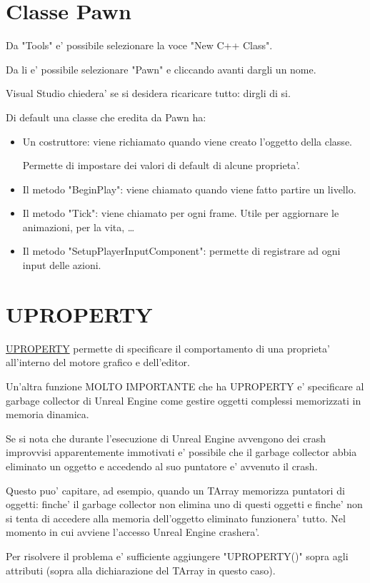     \section{Classe Pawn}

        Da "Tools" e' possibile selezionare la voce "New C++ Class".

        Da li e' possibile selezionare "Pawn" e cliccando avanti dargli un nome.

        \begin{notebox}
            Visual Studio chiedera' se si desidera ricaricare tutto: dirgli di si.
        \end{notebox}

        Di default una classe che eredita da Pawn ha:
        \begin{itemize}
            \item Un costruttore: viene richiamato quando viene creato l'oggetto della classe.

                Permette di impostare dei valori di default di alcune proprieta'.

            \item Il metodo "BeginPlay": viene chiamato quando viene fatto partire un livello.
            \item Il metodo "Tick": viene chiamato per ogni frame. Utile per aggiornare le animazioni, per la vita, \dots
            \item Il metodo "SetupPlayerInputComponent": permette di registrare ad ogni input delle azioni.
        \end{itemize}


    \section{UPROPERTY}
        \href{https://docs.unrealengine.com/5.0/en-US/unreal-engine-uproperty-specifiers}{UPROPERTY} permette di specificare il comportamento di una proprieta' all'interno del motore grafico e dell'editor.

        Un'altra funzione MOLTO IMPORTANTE che ha UPROPERTY e' specificare al garbage collector di Unreal Engine come gestire oggetti complessi memorizzati in memoria dinamica.

        \begin{warningbox}
            Se si nota che durante l'esecuzione di Unreal Engine avvengono dei crash improvvisi apparentemente immotivati
            e' possibile che il garbage collector abbia eliminato un oggetto e accedendo al suo puntatore e' avvenuto il crash.

            Questo puo' capitare, ad esempio, quando un TArray memorizza puntatori di oggetti: finche' il garbage collector non elimina uno di questi oggetti
            e finche' non si tenta di accedere alla memoria dell'oggetto eliminato funzionera' tutto.
            Nel momento in cui avviene l'accesso Unreal Engine crashera'.

            Per risolvere il problema e' sufficiente aggiungere "UPROPERTY()" sopra agli attributi (sopra alla dichiarazione del TArray in questo caso).
        \end{warningbox}

